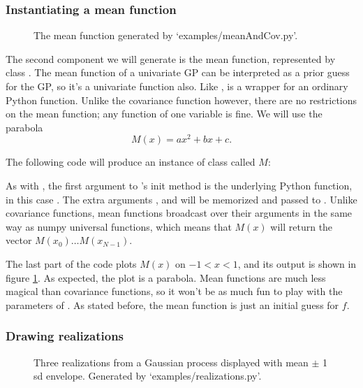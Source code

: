 \documentclass{manual}
\begin{document}
\subsubsection{Instantiating a mean function}\label{subsub:mean}

\begin{figure}
	\centering
	\caption{The mean function generated by {\sffamily `examples/meanAndCov.py'}.}
	\label{fig:mean}
\end{figure}

The second component we will generate is the mean function, represented by class . The mean function of a univariate GP can be interpreted as a prior guess for the GP, so it's a univariate function also. Like ,  is a wrapper for an ordinary Python function. Unlike the covariance function however, there are no restrictions on the mean function; any function of one variable is fine. We will use the parabola
\begin{equation}
	M(x) = ax^2 + bx + c.
\end{equation}

The following code will produce an instance of class  called $M$:


As with , the first argument to 's init method is the underlying Python function, in this case . The extra arguments ,   and  will be memorized and passed to .
Unlike covariance functions, mean functions broadcast over their arguments in the same way as numpy universal functions, which means that $M(x)$ will return the vector $M(x_0)\ldots M(x_{N-1})$. 

The last part of the code plots $M(x)$ on $-1<x<1$, and its output is shown in figure \ref{fig:mean}. As expected, the plot is a parabola. Mean functions are much less magical than covariance functions, so it won't be as much fun to play with the parameters of . As stated before, the mean function is just an initial guess for $f$.

\subsubsection{Drawing realizations}\label{subsub:realizations}
\begin{figure}
	\centering
	\caption{Three realizations from a Gaussian process displayed with mean $\pm$ 1 sd envelope. Generated by {\sffamily `examples/realizations.py'}.}
	\label{fig:realizations}
\end{figure}
\end{document}
